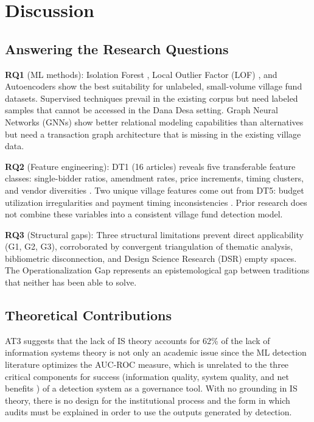 \documentclass[3p,times,procedia]{elsarticle}
\begin{document}
\section{Discussion}
\label{sec:discussion}

\subsection{Answering the Research Questions}

\textbf{RQ1} (ML methods): Isolation Forest \cite{p015}, Local Outlier Factor (LOF) \cite{p041}, and Autoencoders \cite{p003,p015}show the best suitability for unlabeled, small-volume village fund datasets. Supervised techniques prevail in the existing corpus \cite{p003,p007,p022,p026,p039} but need labeled samples that cannot be accessed in the Dana Desa setting. Graph Neural Networks (GNNs) show better relational modeling capabilities \cite{p014,p045} than alternatives but need a transaction graph architecture that is missing in the existing village data.

\textbf{RQ2} (Feature engineering): DT1 (16 articles) reveals five transferable feature classes: single-bidder ratios, amendment rates, price increments, timing clusters, and vendor diversities \cite{p008,p043}. Two unique village features come out from DT5: budget utilization irregularities and payment timing inconsistencies \cite{method_kpk2023}. Prior research does not combine these variables into a consistent village fund detection model.

\textbf{RQ3} (Structural gaps): Three structural limitations prevent direct applicability (G1, G2, G3), corroborated by convergent triangulation of thematic analysis, bibliometric disconnection, and Design Science Research (DSR) empty spaces. The Operationalization Gap represents an epistemological gap between traditions that neither has been able to solve.

\subsection{Theoretical Contributions}

AT3 suggests that the lack of IS theory accounts for 62\% of the lack of information systems theory is not only an academic issue since the ML detection literature optimizes the AUC-ROC measure, which is unrelated to the three critical components for success (information quality, system quality, and net benefits \cite{method_delone2003}) of a detection system as a governance tool. With no grounding in IS theory, there is no design for the institutional process and the form in which audits must be explained in order to use the outputs generated by detection.
\end{document}
